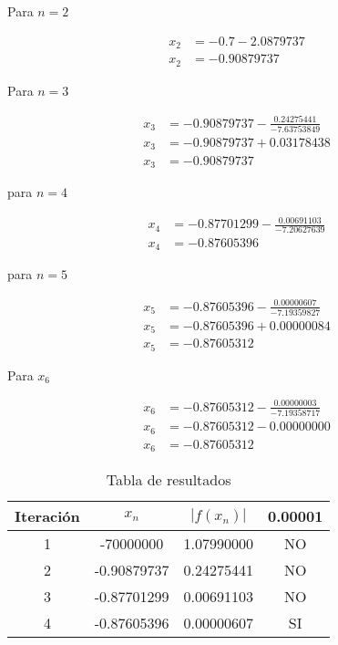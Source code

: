
Para $n=2$

\begin{align*}
	x_2 & =-0.7-2.0879737 \\
	x_2 & =-0.90879737
\end{align*}

Para $n=3$

\begin{align*}
	x_3 & =-0.90879737-\frac{0.24275441}{-7.63753849} \\
	x_3 & =-0.90879737+0.03178438                     \\
	x_3 & =-0.90879737
\end{align*}

para $n=4$

\begin{align*}
	x_4 & =-0.87701299-\frac{0.00691103}{-7.20627639} \\
	x_4 & =-0.87605396
\end{align*}

para $n=5$

\begin{align*}
	x_5 & =-0.87605396-\frac{0.00000607}{-7.19359827} \\
	x_5 & =-0.87605396+0.00000084                     \\
	x_5 & =-0.87605312
\end{align*}

Para $x_6$

\begin{align*}
	x_6 & =-0.87605312-\frac{0.00000003}{-7.19358717} \\
	x_6 & =-0.87605312-0.00000000                     \\
	x_6 & =-0.87605312
\end{align*}


\begin{table}[h!]
	\centering
	\begin{tabular}{|c|c|c|c|}
		\hline
		Iteración & $x_n$       & $\left\lvert f(x_n)\right\rvert $ & 0.00001 \\ \hline
		1         & -70000000   & 1.07990000                        & NO      \\ \hline
		2         & -0.90879737 & 0.24275441                        & NO      \\ \hline
		3         & -0.87701299 & 0.00691103                        & NO      \\ \hline
		4         & -0.87605396 & 0.00000607                        & SI      \\ \hline
	\end{tabular}
	\caption{Tabla de resultados}
	\label{tabfmc18}
\end{table}


